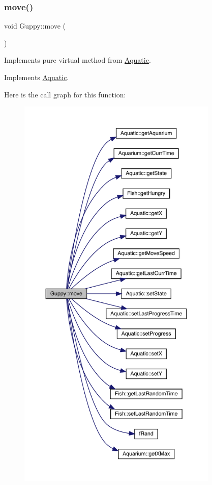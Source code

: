 \subsubsection{\texorpdfstring{move()}{move()}}
{\footnotesize\ttfamily void Guppy\+::move (\begin{DoxyParamCaption}{ }\end{DoxyParamCaption})\hspace{0.3cm}{\ttfamily [virtual]}}



Implements pure virtual method from \mbox{\hyperlink{class_aquatic}{Aquatic}}. 



Implements \mbox{\hyperlink{class_aquatic_a962e93c804814eeaf3cea6e26698eef7}{Aquatic}}.

Here is the call graph for this function\+:\nopagebreak
\begin{figure}[H]
\begin{center}
\leavevmode
\includegraphics[height=550pt]{class_guppy_ae6002948d74b3741bed34a7311be4377_cgraph}
\end{center}
\end{figure}
